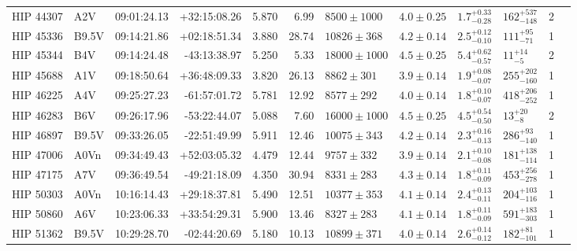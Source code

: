 \begin{tiny}
\begin{longtable}{|l|lrrrrllllll|}
   HIP 44307 &      A2V &    09:01:24.13 &   +32:15:08.26 &   5.870 &      6.99 &   $8500 \pm 1000$ &  $4.0 \pm 0.25$ &  $1.7^{+0.33}_{-0.28}$ &   $162^{+537}_{-148}$ &       2 \\
   HIP 45336 &    B9.5V &    09:14:21.86 &   +02:18:51.34 &   3.880 &     28.74 &   $10826 \pm 368$ &  $4.2 \pm 0.14$ &  $2.5^{+0.12}_{-0.10}$ &     $111^{+95}_{-71}$ &       1 \\
   HIP 45344 &      B4V &    09:14:24.48 &   -43:13:38.97 &   5.250 &      5.33 &  $18000 \pm 1000$ &  $4.5 \pm 0.25$ &  $5.4^{+0.62}_{-0.57}$ &       $11^{+14}_{-5}$ &       2 \\
   HIP 45688 &      A1V &    09:18:50.64 &   +36:48:09.33 &   3.820 &     26.13 &    $8862 \pm 301$ &  $3.9 \pm 0.14$ &  $1.9^{+0.08}_{-0.07}$ &   $255^{+202}_{-160}$ &       1 \\
   HIP 46225 &      A4V &    09:25:27.23 &   -61:57:01.72 &   5.781 &     12.92 &    $8577 \pm 292$ &  $4.0 \pm 0.14$ &  $1.8^{+0.10}_{-0.07}$ &   $418^{+206}_{-252}$ &       1 \\
   HIP 46283 &      B6V &    09:26:17.96 &   -53:22:44.07 &   5.088 &      7.60 &  $16000 \pm 1000$ &  $4.5 \pm 0.25$ &  $4.5^{+0.54}_{-0.50}$ &       $13^{+20}_{-8}$ &       2 \\
   HIP 46897 &    B9.5V &    09:33:26.05 &   -22:51:49.99 &   5.911 &     12.46 &   $10075 \pm 343$ &  $4.2 \pm 0.14$ &  $2.3^{+0.16}_{-0.13}$ &    $286^{+93}_{-140}$ &       1 \\
   HIP 47006 &     A0Vn &    09:34:49.43 &   +52:03:05.32 &   4.479 &     12.44 &    $9757 \pm 332$ &  $3.9 \pm 0.14$ &  $2.1^{+0.10}_{-0.08}$ &   $181^{+138}_{-114}$ &       1 \\
   HIP 47175 &      A7V &    09:36:49.54 &   -49:21:18.09 &   4.350 &     30.94 &    $8331 \pm 283$ &  $4.3 \pm 0.14$ &  $1.8^{+0.11}_{-0.09}$ &   $453^{+256}_{-278}$ &       1 \\
   HIP 50303 &     A0Vn &    10:16:14.43 &   +29:18:37.81 &   5.490 &     12.51 &   $10377 \pm 353$ &  $4.1 \pm 0.14$ &  $2.4^{+0.13}_{-0.11}$ &   $204^{+103}_{-116}$ &       1 \\
   HIP 50860 &      A6V &    10:23:06.33 &   +33:54:29.31 &   5.900 &     13.46 &    $8327 \pm 283$ &  $4.1 \pm 0.14$ &  $1.8^{+0.11}_{-0.09}$ &   $591^{+183}_{-303}$ &       1 \\
   HIP 51362 &    B9.5V &    10:29:28.70 &   -02:44:20.69 &   5.180 &     10.13 &   $10899 \pm 371$ &  $4.0 \pm 0.14$ &  $2.6^{+0.14}_{-0.12}$ &    $182^{+81}_{-101}$ &       1 \\

\end{longtable}
\end{tiny}
